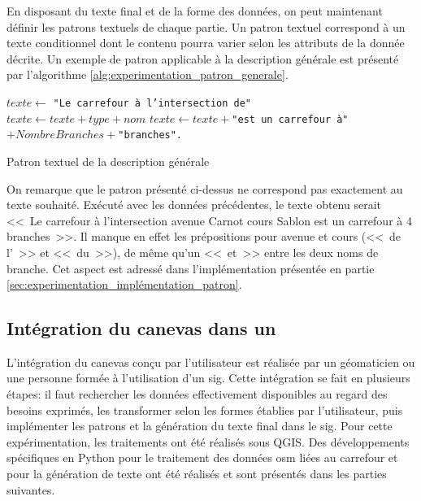 \label{sec:experimentation_preparation_patron}

En disposant du texte final et de la forme des données, on peut maintenant définir les patrons textuels de chaque partie. Un patron textuel correspond à un texte conditionnel dont le contenu pourra varier selon les attributs de la donnée décrite. Un exemple de patron applicable à la description générale est présenté par l'algorithme \ref{alg:experimentation_patron_generale}.

\begin{algorithm}
    \vspace{0.3cm}
    $texte \leftarrow $ \texttt{"Le carrefour à l'intersection de"}\\
     {
        $texte \leftarrow texte + type + nom$
    }
    $texte \leftarrow texte +$\texttt{"est un carrefour à"}$+ NombreBranches+$\texttt{"branches".}
    \vspace{0.3cm}
    \caption[Patron textuel de la description générale]{Patron textuel de la description générale}

\label{alg:experimentation_patron_generale}
\end{algorithm}

\newpage

On remarque que le patron présenté ci-dessus ne correspond pas exactement au texte souhaité. Exécuté avec les données précédentes, le texte obtenu serait <<~Le carrefour à l'intersection avenue Carnot cours Sablon est un carrefour à 4 branches~>>. Il manque en effet les prépositions pour avenue et cours (<<~de l'~>> et <<~du~>>), de même qu'un <<~et~>> entre les deux noms de branche. Cet aspect est adressé dans l'implémentation présentée en partie \ref{sec:experimentation_implémentation_patron}.

\subsection{Intégration du canevas dans un }

L'intégration du canevas conçu par l'utilisateur est réalisée par un géomaticien ou une personne formée à l'utilisation d'un \gls{sig}. Cette intégration se fait en plusieurs étapes: il faut rechercher les données effectivement disponibles au regard des besoins exprimés, les transformer selon les formes établies par l'utilisateur, puis implémenter les patrons et la génération du texte final dans le \gls{sig}. Pour cette expérimentation, les traitements ont été réalisés sous QGIS. Des développements spécifiques en Python pour le traitement des données \gls{osm} liées au carrefour et pour la génération de texte ont été réalisés et sont présentés dans les parties suivantes.

